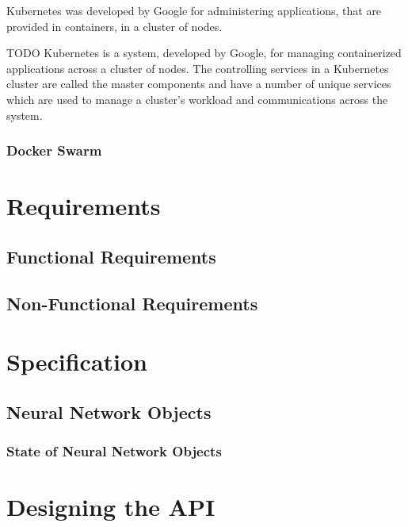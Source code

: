 Kubernetes was developed by Google for administering applications, that
are provided in containers, in a cluster of nodes. \cite{kub_intro}

TODO Kubernetes is a system, developed by Google, for managing
containerized applications across a cluster of nodes. The controlling
services in a Kubernetes cluster are called the master components and
have a number of unique services which are used to manage a cluster's
workload and communications across the system\cite{kub_intro}.

\subsection{Docker Swarm}\label{docker-swarm}

\chapter{Requirements}\label{requirements}

\section{Functional Requirements}\label{functional-requirements}

\section{Non-Functional Requirements}\label{non-functional-requirements}

\chapter{Specification}\label{specification}

\section{Neural Network Objects}\label{neural-network-objects}

\subsection{State of Neural Network
Objects}\label{state-of-neural-network-objects}


\chapter{Designing the API}\label{designing-the-api}

